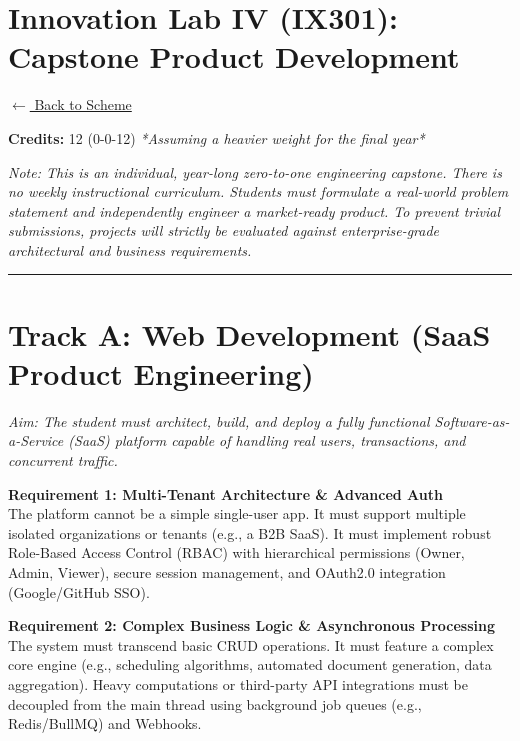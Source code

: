 \section*{Innovation Lab IV (IX301): Capstone Product Development}
\label{course:IX301}

\noindent \small{\hyperref[main:scheme]{$\leftarrow$ Back to Scheme}} \vspace{0.5cm}

\noindent \textbf{Credits:} 12 (0-0-12) \textit{*Assuming a heavier weight for the final year*}

\noindent \textit{Note: This is an individual, year-long zero-to-one engineering capstone. There is no weekly instructional curriculum. Students must formulate a real-world problem statement and independently engineer a market-ready product. To prevent trivial submissions, projects will strictly be evaluated against enterprise-grade architectural and business requirements.}

\vspace{0.5cm}
\hrule
\vspace{0.5cm}

\section*{Track A: Web Development (SaaS Product Engineering)}
\noindent \textit{Aim: The student must architect, build, and deploy a fully functional Software-as-a-Service (SaaS) platform capable of handling real users, transactions, and concurrent traffic.}

\vspace{0.3cm}

\noindent\textbf{Requirement 1: Multi-Tenant Architecture \& Advanced Auth} \\
The platform cannot be a simple single-user app. It must support multiple isolated organizations or tenants (e.g., a B2B SaaS). It must implement robust Role-Based Access Control (RBAC) with hierarchical permissions (Owner, Admin, Viewer), secure session management, and OAuth2.0 integration (Google/GitHub SSO).

\vspace{0.3cm}

\noindent\textbf{Requirement 2: Complex Business Logic \& Asynchronous Processing} \\
The system must transcend basic CRUD operations. It must feature a complex core engine (e.g., scheduling algorithms, automated document generation, data aggregation). Heavy computations or third-party API integrations must be decoupled from the main thread using background job queues (e.g., Redis/BullMQ) and Webhooks.

